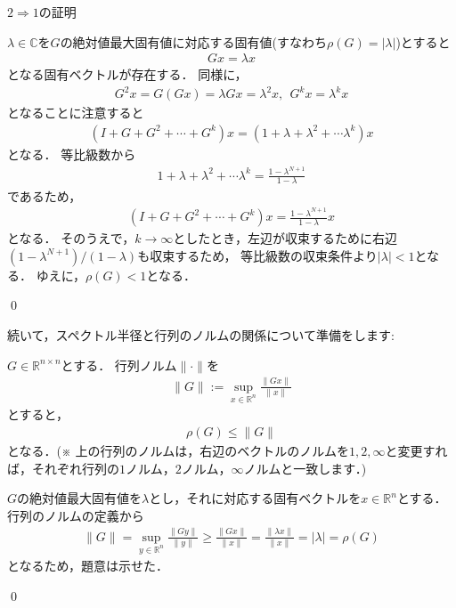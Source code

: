 \begin{Proof}
	\noindent $2 \Rightarrow 1$の証明

	$\lambda \in {\mathbb C}$を$G$の絶対値最大固有値に対応する固有値(すなわち$\rho(G) = | \lambda |$)とすると
	\begin{align*}
		G x = \lambda x
	\end{align*}
	となる固有ベクトルが存在する．
	同様に，
	\begin{align*}
		G^2 x = G (Gx) = \lambda G x = \lambda^2 x, ~~ G^k x = \lambda^k x
	\end{align*}
	となることに注意すると
	\begin{align*}
		(I + G + G^2 + \cdots + G^k) x = (1 + \lambda + \lambda^2 + \cdots \lambda^k) x
	\end{align*}
	となる．
	等比級数から
	\begin{align*}
		1 + \lambda + \lambda^2 + \cdots \lambda^k = \frac{ 1 - \lambda^{N+1} }{1 - \lambda}
	\end{align*}
	であるため，
	\begin{align*}
		(I + G + G^2 + \cdots + G^k) x = \frac{ 1 - \lambda^{N+1} }{1 - \lambda} x
	\end{align*}
	となる．
	そのうえで，$k \rightarrow \infty$としたとき，左辺が収束するために右辺$(1 - \lambda^{N+1})/(1 - \lambda)$も収束するため，
	等比級数の収束条件より$| \lambda | < 1$となる．
	ゆえに，$\rho(G) < 1$となる．
	
	\qed
\end{Proof}

続いて，スペクトル半径と行列のノルムの関係について準備をします:
\begin{Thm}\label{thm:spec_norm}
	$G \in {\mathbb R}^{n \times n}$とする．
	行列ノルム$\| \cdot \|$を
	\begin{align*}
		\| G \| := \sup_{x \in {\mathbb R}^n} \frac{ \| G x \| }{\| x \|}
	\end{align*}
	とすると，
	\begin{align*}
		\rho(G) \le \| G \|
	\end{align*}	
	となる．(※ 上の行列のノルムは，右辺のベクトルのノルムを$1, 2, \infty$と変更すれば，それぞれ行列の$1$ノルム，$2$ノルム，$\infty$ノルムと一致します．)
\end{Thm}
\begin{Proof}
	$G$の絶対値最大固有値を$\lambda$とし，それに対応する固有ベクトルを$x \in {\mathbb R}^n$とする．
	行列のノルムの定義から
	\begin{align*}
		\| G \| = \sup_{y \in {\mathbb R}^n}\frac{ \| G y \| }{\| y \|} \ge \frac{ \| G x \| }{\| x \|} = \frac{ \| \lambda x \| }{\| x \|} = | \lambda | = \rho(G)
	\end{align*}	
	となるため，題意は示せた．

	\qed
\end{Proof}

